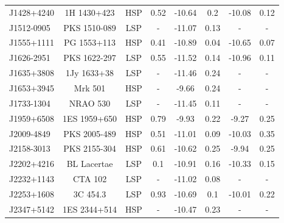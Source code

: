 \begin{table}
\begin{tabular}{lccccccc}
J1428+4240 & 1H 1430+423 & HSP & 0.52 & -10.64 & 0.2 & -10.08 & 0.12  \\
J1512-0905 & PKS 1510-089 & LSP & - & -11.07 & 0.13 & - & - \\ 
J1555+1111 & PG 1553+113 & HSP & 0.41 & -10.89 & 0.04 & -10.65 & 0.07  \\
J1626-2951 & PKS 1622-297 & LSP & 0.55 & -11.52 & 0.14 & -10.96 & 0.11  \\
J1635+3808 & 1Jy 1633+38 & LSP & - & -11.46 & 0.24 & - & -  \\
J1653+3945 & Mrk 501 & HSP & - & -9.66 & 0.24 & - & - \\ 
J1733-1304 & NRAO 530 & LSP & - & -11.45 & 0.11 & - & - \\
J1959+6508 & 1ES 1959+650 & HSP & 0.79 & -9.93 & 0.22 & -9.27 & 0.25  \\
J2009-4849 & PKS 2005-489 & HSP & 0.51 & -11.01 & 0.09 & -10.03 & 0.35  \\
J2158-3013 & PKS 2155-304 & HSP & 0.61 & -10.62 & 0.25 & -9.94 & 0.25  \\
J2202+4216 & BL Lacertae & LSP & 0.1 & -10.91 & 0.16 & -10.33 & 0.15  \\
J2232+1143 & CTA 102 & LSP & - & -11.02 & 0.08 & - & - \\
J2253+1608 & 3C 454.3 & LSP & 0.93 & -10.69 & 0.1 & -10.01 & 0.22  \\
J2347+5142 & 1ES 2344+514 & HSP & - & -10.47 & 0.23 & - & -  \\  
\bottomrule
\end{tabular}
\label{tab:par_sources}
\end{table}




